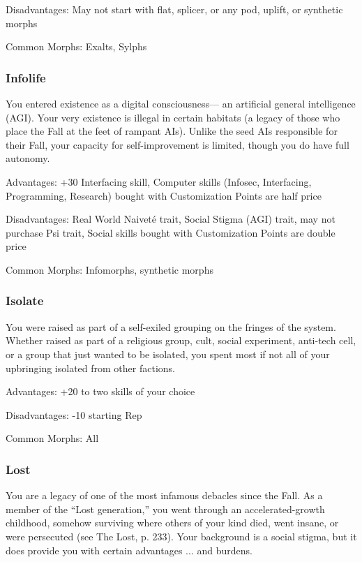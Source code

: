 Disadvantages: May not start with flat, splicer, or any pod, uplift, or synthetic morphs

Common Morphs: Exalts, Sylphs

\subsubsection{Infolife} 
\label{sec:infolife}

You entered existence as a digital consciousness— an artificial general intelligence (AGI). Your very existence is illegal in certain habitats (a legacy of those who place the Fall at the feet of rampant AIs). Unlike the seed AIs responsible for their Fall, your capacity for self-improvement is limited, though you do have full autonomy. 

Advantages: +30 Interfacing skill, Computer skills (Infosec, Interfacing, Programming, Research) bought with Customization Points are half price 

Disadvantages: Real World Naiveté trait, Social Stigma (AGI) trait, may not purchase Psi trait, Social skills bought with Customization Points are double price 

Common Morphs: Infomorphs, synthetic morphs

\subsubsection{Isolate}
\label{sec:isolite}

You were raised as part of a self-exiled grouping on the fringes of the system. Whether raised as part of a religious group, cult, social experiment, anti-tech cell, or a group that just wanted to be isolated, you spent most if not all of your upbringing isolated from other factions.

Advantages: +20 to two skills of your choice 

Disadvantages: -10 starting Rep 

Common Morphs: All

\subsubsection{Lost}
\label{sec:lost}

You are a legacy of one of the most infamous debacles since the Fall. As a member of the “Lost generation,” you went through an accelerated-growth childhood, somehow surviving where others of your kind died, went insane, or were persecuted (see The Lost, p. 233). Your background is a social stigma, but it does provide you with certain advantages ... and burdens. 


